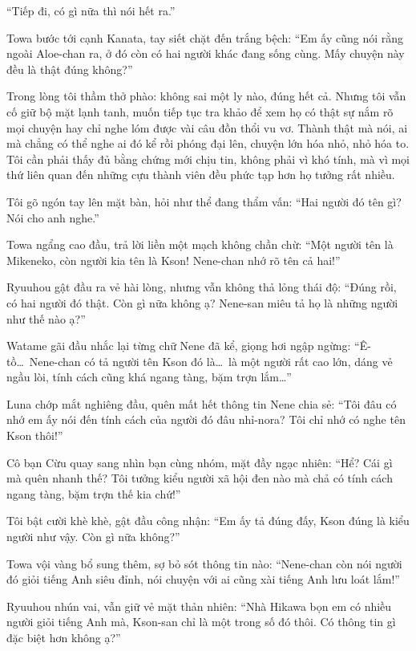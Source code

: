\documentclass[../main.tex]{subfiles}
\begin{document}
``Tiếp đi, có gì nữa thì nói hết ra.''

Towa bước tới cạnh Kanata, tay siết chặt đến trắng bệch: ``Em ấy cũng nói rằng ngoài Aloe-chan ra, ở đó còn có hai người khác đang sống cùng. Mấy chuyện này đều là thật đúng không?''

Trong lòng tôi thầm thở phào: không sai một ly nào, đúng hết cả. Nhưng tôi vẫn cố giữ bộ mặt lạnh tanh, muốn tiếp tục tra khảo để xem họ có thật sự nắm rõ mọi chuyện hay chỉ nghe lóm được vài câu đồn thổi vu vơ. Thành thật mà nói, ai mà chẳng có thể nghe ai đó kể rồi phóng đại lên, chuyện lớn hóa nhỏ, nhỏ hóa to. Tôi cần phải thấy đủ bằng chứng mới chịu tin, không phải vì khó tính, mà vì mọi thứ liên quan đến những cựu thành viên đều phức tạp hơn họ tưởng rất nhiều.

Tôi gõ ngón tay lên mặt bàn, hỏi như thể đang thẩm vấn: ``Hai người đó tên gì? Nói cho anh nghe.''

Towa ngẩng cao đầu, trả lời liền một mạch không chần chừ: ``Một người tên là Mikeneko, còn người kia tên là Kson! Nene-chan nhớ rõ tên cả hai!''

Ryuuhou gật đầu ra vẻ hài lòng, nhưng vẫn không thả lỏng thái độ: ``Đúng rồi, có hai người đó thật. Còn gì nữa không ạ? Nene-san miêu tả họ là những người như thế nào ạ?''

Watame gãi đầu nhắc lại từng chữ Nene đã kể, giọng hơi ngập ngừng: ``Ê-tồ\dots\ Nene-chan có tả người tên Kson đó là\dots\ là một người rất cao lớn, dáng vẻ ngầu lòi, tính cách cũng khá ngang tàng, bặm trợn lắm\dots''

Luna chớp mắt nghiêng đầu, quên mất hết thông tin Nene chia sẻ: ``Tôi đâu có nhớ em ấy nói đến tính cách của người đó đâu nhỉ-nora? Tôi chỉ nhớ có nghe tên Kson thôi!''

Cô bạn Cừu quay sang nhìn bạn cùng nhóm, mặt đầy ngạc nhiên: ``Hể? Cái gì mà quên nhanh thế? Tôi tưởng kiểu người xã hội đen nào mà chả có tính cách ngang tàng, bặm trợn thế kia chứ!''

Tôi bật cười khè khè, gật đầu công nhận: ``Em ấy tả đúng đấy, Kson đúng là kiểu người như vậy. Còn gì nữa không?''

Towa vội vàng bổ sung thêm, sợ bỏ sót thông tin nào: ``Nene-chan còn nói người đó giỏi tiếng Anh siêu đỉnh, nói chuyện với ai cũng xài tiếng Anh lưu loát lắm!''

Ryuuhou nhún vai, vẫn giữ vẻ mặt thản nhiên: ``Nhà Hikawa bọn em có nhiều người giỏi tiếng Anh mà, Kson-san chỉ là một trong số đó thôi. Có thông tin gì đặc biệt hơn không ạ?''
\end{document}
